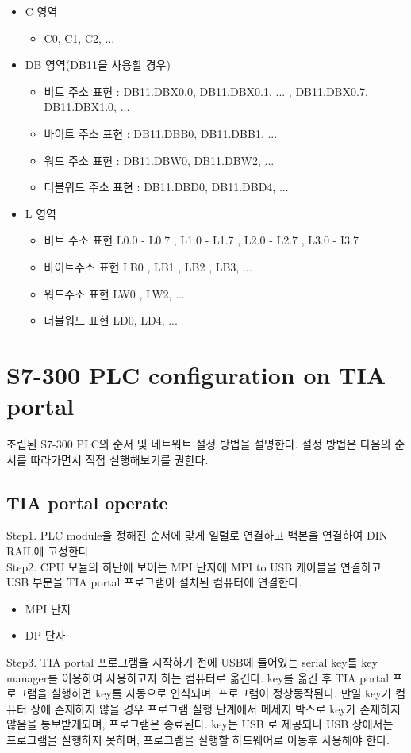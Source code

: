 \documentclass[11pt
  , a4paper
  , article
  , oneside
]{memoir}
\begin{document}
\begin{itemize}
\item C 영역
\begin{itemize}
\item C0, C1, C2, ...
\end{itemize}
\item DB 영역(DB11을 사용할 경우)
\begin{itemize}
\item 비트 주소 표현 : DB11.DBX0.0, DB11.DBX0.1, ... , DB11.DBX0.7, DB11.DBX1.0, ...
\item 바이트 주소 표현 : DB11.DBB0, DB11.DBB1, ...
\item 워드 주소 표현 : DB11.DBW0, DB11.DBW2, ...
\item 더블워드 주소 표현 : DB11.DBD0, DB11.DBD4, ...
\end{itemize}
\item L 영역
\begin{itemize}
\item 비트 주소 표현 L0.0 - L0.7 , L1.0 - L1.7 , L2.0 - L2.7 , L3.0 - I3.7
\item 바이트주소 표현 LB0 , LB1 , LB2 , LB3, ...
\item 워드주소 표현 LW0 , LW2, ...
\item 더블워드 표현 LD0, LD4, ...
\end{itemize}
\end{itemize}

\chapter{S7-300 PLC configuration on TIA portal}
조립된 S7-300 PLC의 순서 및 네트워트 설정 방법을 설명한다. 설정 방법은 다음의 순서를 따라가면서 직접 실행해보기를 권한다.

\section{TIA portal operate}

 Step1. PLC module을 정해진 순서에 맞게 일렬로 연결하고 백본을 연결하여 DIN RAIL에 고정한다.\\
\newline Step2. CPU 모듈의 하단에 보이는 MPI 단자에 MPI to USB 케이블을 연결하고 USB 부분을 TIA portal 프로그램이 설치된 컴퓨터에 연결한다.
\begin{itemize}
\item MPI 단자
\item DP 단자
\end{itemize}
Step3. TIA portal 프로그램을 시작하기 전에 USB에 들어있는 serial key를 key manager를 이용하여 사용하고자 하는 컴퓨터로 옮긴다. key를 옮긴 후 TIA portal 프로그램을 실행하면 key를 자동으로 인식되며, 프로그램이 정상동작된다. 만일 key가 컴퓨터 상에 존재하지 않을 경우 프로그램 실행 단계에서 메세지 박스로 key가 존재하지 않음을 통보받게되며, 프로그램은 종료된다. key는 USB 로 제공되나 USB 상에서는 프로그램을 실행하지 못하며, 프로그램을 실행할 하드웨어로 이동후 사용해야 한다.
\end{document}
